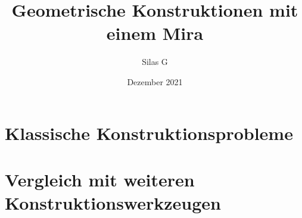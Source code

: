 \documentclass{scrbook}
\begin{document}
\frontmatter
\begin{titlepage}
    \title{Geometrische Konstruktionen mit einem Mira}
    \author{Silas G}
    \date{Dezember 2021}
    \maketitle
\end{titlepage}
\tableofcontents

\mainmatter



\chapter{Klassische Konstruktionsprobleme}
\chapter{Vergleich mit weiteren Konstruktionswerkzeugen}
 
\backmatter


\listoffigures
\end{document}
